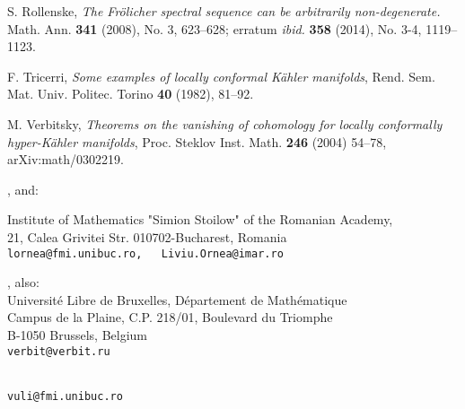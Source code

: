 \documentclass[11pt]{article}
\numberwithin{equation}{section}
\newcommand{\6}{\partial}
\def\1{\sqrt{-1}\:}
\newcounter{example}[section]
\begin{document}
{\begin{thebibliography}{100}
S. Rollenske, 
{\em 
The Fr\"olicher spectral sequence can be arbitrarily non-degenerate. }
Math. Ann. {\bf 341} (2008), No. 3, 623--628; erratum {\em ibid.} {\bf 358} (2014), No. 3-4, 1119--1123.



 F. Tricerri, {\it Some examples of locally
conformal K{\"a}hler manifolds}, Rend.  Sem.  Mat.  Univ.
Politec.  Torino {\bf 40} (1982), 81--92.



M. Verbitsky, {\em Theorems on the
vanishing of cohomology for
locally conformally hyper-K\"ahler manifolds}, Proc. Steklov Inst. Math.
{\bf 246} (2004) 54--78, arXiv:math/0302219.




\end{thebibliography}
}

{\small

, and:\\
{\sc Institute of Mathematics "Simion Stoilow" of the Romanian
Academy,\\
21, Calea Grivitei Str.
010702-Bucharest, Romania\\
\tt lornea@fmi.unibuc.ro, \ \  Liviu.Ornea@imar.ro

\hfill



, also: \\
{\sc Universit\'e Libre de Bruxelles, D\'epartement de Math\'ematique\\
Campus de la Plaine, C.P. 218/01, Boulevard du Triomphe\\
B-1050 Brussels, Belgium\\
\tt verbit@verbit.ru }

\hfill

\\
\tt vuli@fmi.unibuc.ro
}}

\end{document}
